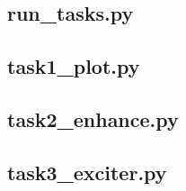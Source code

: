 \documentclass[11pt,a4paper]{article}
\begin{document}
\subsection{run\_tasks.py}


\subsection{task1\_plot.py}


\subsection{task2\_enhance.py}


\subsection{task3\_exciter.py}

\end{document}
